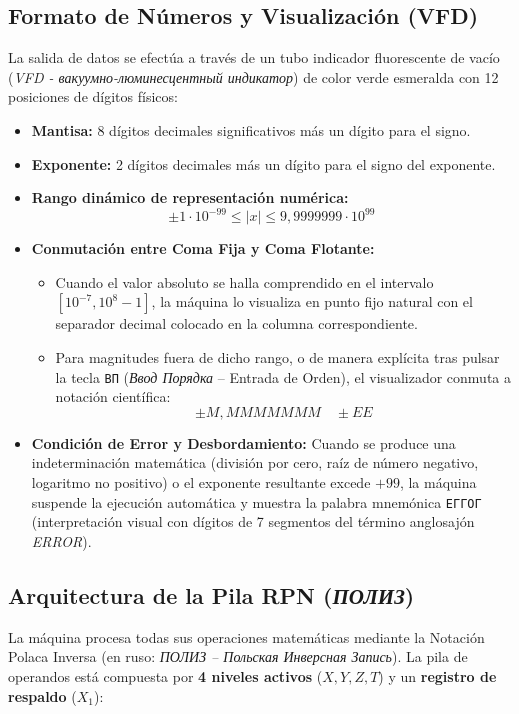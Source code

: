 \documentclass[11pt,a4paper]{article}
\begin{document}
\subsection{Formato de Números y Visualización (VFD)}
La salida de datos se efectúa a través de un tubo indicador fluorescente de vacío (\textit{VFD - вакуумно-люминесцентный индикатор}) de color verde esmeralda con 12 posiciones de dígitos físicos:
\begin{itemize}
    \item \textbf{Mantisa:} 8 dígitos decimales significativos más un dígito para el signo.
    \item \textbf{Exponente:} 2 dígitos decimales más un dígito para el signo del exponente.
    \item \textbf{Rango dinámico de representación numérica:}
    \[
    \pm 1 \cdot 10^{-99} \le |x| \le 9{,}9999999 \cdot 10^{99}
    \]
    \item \textbf{Conmutación entre Coma Fija y Coma Flotante:}
    \begin{itemize}
        \item Cuando el valor absoluto se halla comprendido en el intervalo $[10^{-7}, 10^8 - 1]$, la máquina lo visualiza en punto fijo natural con el separador decimal colocado en la columna correspondiente.
        \item Para magnitudes fuera de dicho rango, o de manera explícita tras pulsar la tecla \texttt{ВП} (\textit{Ввод Порядка} -- Entrada de Orden), el visualizador conmuta a notación científica:
        \[
        \pm M{,}MMMMMMM \quad \pm EE
        \]
    \end{itemize}
    \item \textbf{Condición de Error y Desbordamiento:} Cuando se produce una indeterminación matemática (división por cero, raíz de número negativo, logaritmo no positivo) o el exponente resultante excede $+99$, la máquina suspende la ejecución automática y muestra la palabra mnemónica \texttt{ЕГГОГ} (interpretación visual con dígitos de 7 segmentos del término anglosajón \textit{ERROR}).
\end{itemize}

\subsection{Arquitectura de la Pila RPN (\textit{ПОЛИЗ})}
La máquina procesa todas sus operaciones matemáticas mediante la Notación Polaca Inversa (en ruso: \textit{ПОЛИЗ -- Польская Инверсная Запись}). La pila de operandos está compuesta por \textbf{4 niveles activos} ($X, Y, Z, T$) y un \textbf{registro de respaldo} ($X_1$):
\end{document}
